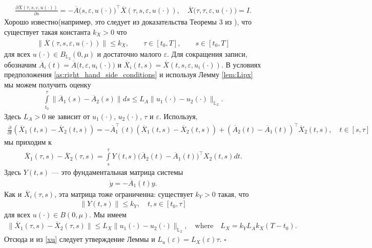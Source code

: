 \documentclass[../main.tex]{subfiles}
\begin{document}
\begin{gather*}
	\frac{\partial \overline{X}(\tau,s,\varepsilon,u(\cdot))}{\partial s} = -\overline{A}\big(s,\varepsilon,u(\cdot)\big)^{\top} \overline{X}(\tau,s,\varepsilon,u(\cdot)), \quad \overline{X}\big(\tau,\tau,\varepsilon,u(\cdot)\big) = I.
\end{gather*}
Хорошо известно(например, это следует из доказательства Теоремы 3 из \cite{Fillipov}), что существует такая константа $k_X>0$ что
\begin{gather*}
	\| \overline{X}(\tau,s,\varepsilon,u(\cdot)) \| \leqslant k_X, \qquad \tau \in [t_0,T], \qquad s \in [t_0,T]
\end{gather*}
для всех $u(\cdot) \in B_{\mathbb{L}_2}(0,\mu)$ и достаточно малого $\varepsilon $. Для сокращения записи, обозначим $\overline{A}_i(t) = \overline{A}\big(t,\varepsilon,u_i(\cdot)\big) $ и $ \overline{X}_i(t,s) = \overline{X}(t,s,\varepsilon,u_i(\cdot))$. В условиях предположения \ref{as:right_hand_side_conditions} и используя Лемму \ref{lem:Lipx} мы можем получить оценку
\begin{gather*}
	\int\limits_{t_0}^{\tau} \|\overline{A}_1(s) - \overline{A}_2(s) \| ds \leqslant L_A \| u_1(\cdot) - u_2(\cdot) \|_{\mathbb{L}_2}. 
\end{gather*}
Здесь $L_A>0$ не зависит от $u_1(\cdot)$, $u_2(\cdot)$, $\tau$ и $\varepsilon$. Используя,
\begin{gather*}
	\frac{\partial}{\partial t} \left(\overline{X}_1(t,s) - \overline{X}_2(t,s) \right) = -\overline{A}_1^{\top}(t) \left(\overline{X}_1(t,s) - \overline{X}_2(t,s) \right) + (\overline{A}_2(t) - \overline{A}_1(t))^{\top} \overline{X}_2(t,s), \quad t \in [s,\tau]
\end{gather*}
мы приходим к
\begin{gather*}
	\overline{X}_1(\tau,s) - \overline{X}_2(\tau,s) = \int\limits_s^{\tau} Y(t,s) \big(\overline{A}_2(t) - \overline{A}_1(t)\big)^{\top} X_2(t,s) dt.
\end{gather*}
Здесь $Y(t,s)$ --- это фундаментальная матрица системы 
\begin{gather*}
	\dot{y} = -\overline{A}_1(t) y.
\end{gather*}
Как и $\overline{X}_i(\tau,s)$, эта матрица тоже ограниченна: существует $k_Y>0$ такая, что
\begin{gather*}
	\|Y(t,s)\| \leqslant k_Y, \quad t,s \in [t_0, \tau]
\end{gather*}
для всех $u(\cdot) \in B(0,\mu)$. Мы имеем
\begin{gather*}
	\| \overline{X}_1(\tau,s) - \overline{X}_2(\tau,s) \| \leqslant L_X \| u_1(\cdot) - u_2(\cdot) \|_{\mathbb{L}_2}, \quad \mbox{where} \quad L_X = k_Y L_A k_X (T - t_0) .
\end{gather*}
Отсюда и из \eqref{xu} следует утверждение Леммы и $L_u(\varepsilon) = L_X(\varepsilon)\tau $.
\hfill$\square$\\[1ex]%
\end{document}
